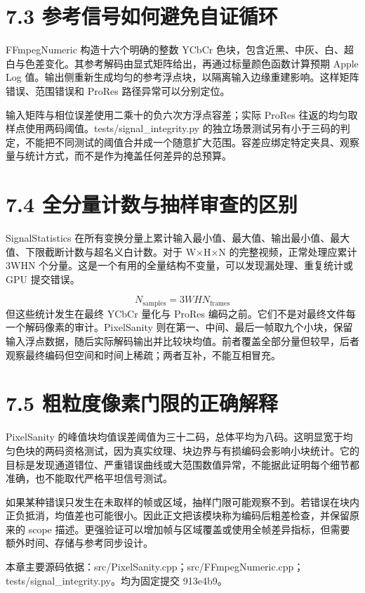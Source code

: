 \documentclass[UTF8,zihao=-4,openany]{ctexbook}
\begin{document}
\section*{7.3 参考信号如何避免自证循环}
FFmpegNumeric 构造十六个明确的整数 YCbCr 色块，包含近黑、中灰、白、超白与色差变化。其参考解码由显式矩阵给出，再通过标量颜色函数计算预期 Apple Log 值。输出侧重新生成均匀的参考浮点块，以隔离输入边缘重建影响。这样矩阵错误、范围错误和 ProRes 路径异常可以分别定位。

输入矩阵与相位误差使用二乘十的负六次方浮点容差；实际 ProRes 往返的均匀取样点使用两码阈值。tests/signal\_integrity.py 的独立场景测试另有小于三码的判定，不能把不同测试的阈值合并成一个随意扩大范围。容差应绑定特定夹具、观察量与统计方式，而不是作为掩盖任何差异的总预算。


\section*{7.4 全分量计数与抽样审查的区别}
SignalStatistics 在所有变换分量上累计输入最小值、最大值、输出最小值、最大值、下限截断计数与超名义白计数。对于 W×H×N 的完整视频，正常处理应累计 3WHN 个分量。这是一个有用的全量结构不变量，可以发现漏处理、重复统计或 GPU 提交错误。


\begin{equation}
N_{\mathrm{samples}}=3WHN_{\mathrm{frames}}
\end{equation}
但这些统计发生在最终 YCbCr 量化与 ProRes 编码之前。它们不是对最终文件每一个解码像素的审计。PixelSanity 则在第一、中间、最后一帧取九个小块，保留输入浮点数据，随后实际解码输出并比较块均值。前者覆盖全部分量但较早，后者观察最终编码但空间和时间上稀疏；两者互补，不能互相冒充。


\section*{7.5 粗粒度像素门限的正确解释}
PixelSanity 的峰值块均值误差阈值为三十二码，总体平均为八码。这明显宽于均匀色块的两码资格测试，因为真实纹理、块边界与有损编码会影响小块统计。它的目标是发现通道错位、严重错误曲线或大范围数值异常，不能据此证明每个细节都准确，也不能取代严格平坦信号测试。

如果某种错误只发生在未取样的帧或区域，抽样门限可能观察不到。若错误在块内正负抵消，均值差也可能很小。因此正文把该模块称为编码后粗差检查，并保留原来的 scope 描述。更强验证可以增加帧与区域覆盖或使用全帧差异指标，但需要额外时间、存储与参考同步设计。


\par\small 本章主要源码依据：src/PixelSanity.cpp；src/FFmpegNumeric.cpp；tests/signal\_integrity.py。均为固定提交 913e4b9。\normalsize
\end{document}
